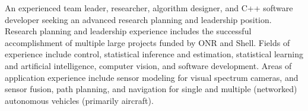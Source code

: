 An experienced team leader, researcher, algorithm designer, and C++ software developer seeking an advanced research planning and leadership position. Research planning and leadership experience includes the successful accomplishment of multiple large projects funded by ONR and Shell. Fields of experience include control, statistical inference and estimation, statistical learning and artificial intelligence, computer vision, and software development. Areas of application experience include sensor modeling for visual spectrum cameras, and sensor fusion, path planning, and navigation for single and multiple (networked) autonomous vehicles (primarily aircraft).
